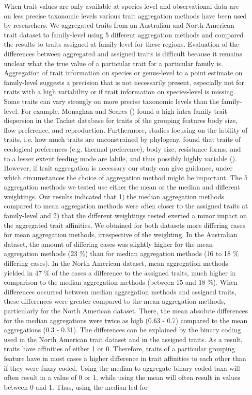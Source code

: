 \documentclass{article}
\begin{document}
When trait values are only available at species-level and observational data are on less precise taxonomic levels various trait aggregation methods have been used by researchers. We aggregated traits from an Australian and North American trait dataset to family-level using 5 different aggregation methods and compared the results to traits assigned at family-level for these regions. Evaluation of the differences between aggregated and assigned traits is difficult because it remains unclear what the true value of a particular trait for a particular family is. Aggregation of trait information on species or genus-level to a point estimate on family-level suggests a precision that is not necessarily present, especially not for traits with a high variability or if trait information on species-level is missing. Some traits can vary strongly on more precise taxonomic levels than the family-level. For example, Monaghan and Soares (\cite{monaghan_improving_2013}) found a high intra-family trait dispersion in the Tachet database for traits of the grouping features body size, flow preference, and reproduction. Furthermore, studies focusing on the lability of traits, i.e. how much traits are unconstrained by phylogeny, found that traits of ecological preferences (e.g. thermal preference), body size, resistance forms, and to a lesser extent feeding mode are labile, and thus possibly highly variable (\cite{poff_functional_2006, wilkes_traitbased_2020}). However, if trait aggregation is necessary our study can give guidance, under which circumstances the choice of aggregation method might be important. The 5 aggregation methods we tested use either the mean or the median and different weightings. Our results indicated that 1) the median aggregation methods compared to mean aggregation methods were often closer to the assigned traits at family-level and 2) that the different weightings tested exerted a minor impact on the aggregated trait affinities. We obtained for both datasets more differing cases for mean aggregation methods, irrespective of the weighting. In the Australian dataset, the amount of differing cases was slightly higher for the mean aggregation methods (23 \%) than for median aggregation methods (16 to 18 \% differing cases). In the North American dataset, mean aggregation methods yielded in 47 \% of the cases a difference to the assigned traits, much higher in comparison to the median aggregation methods (between 15 and 18 \%). When differences occurred between median aggregation methods and assigned traits, these differences were greater compared to the mean aggregation methods, particularly for the North American dataset. There, the mean absolute differences for the median aggregations were twice as high (0.63 - 0.7) compared to the mean aggregations (0.3 - 0.31). The differences can be explained by the binary coding used in the North American trait dataset and in the assigned traits. As a result, traits have affinities of either 1 or 0. Therefore, traits of a particular grouping feature have in most cases a higher difference in trait affinities to each other than if they were fuzzy coded. Using the median to aggregate binary coded taxa will often result in a value of 0 or 1, while using the mean will often result in values between 0 and 1. Thus, using the median led for 
\end{document}

